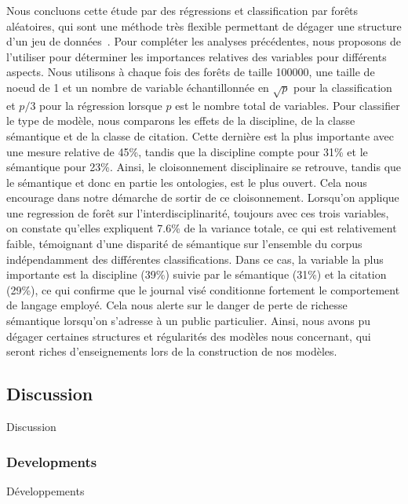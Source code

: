 {Nous concluons cette étude par des régressions et classification par forêts aléatoires, qui sont une méthode très flexible permettant de dégager une structure d'un jeu de données~\cite{liaw2002classification}. Pour compléter les analyses précédentes, nous proposons de l'utiliser pour déterminer les importances relatives des variables pour différents aspects. Nous utilisons à chaque fois des forêts de taille 100000, une taille de noeud de 1 et un nombre de variable échantillonnée en $\sqrt{p}$ pour la classification et $p/3$ pour la régression lorsque $p$ est le nombre total de variables. Pour classifier le type de modèle, nous comparons les effets de la discipline, de la classe sémantique et de la classe de citation. Cette dernière est la plus importante avec une mesure relative de 45\%, tandis que la discipline compte pour 31\% et le sémantique pour 23\%. Ainsi, le cloisonnement disciplinaire se retrouve, tandis que le sémantique et donc en partie les ontologies, est le plus ouvert. Cela nous encourage dans notre démarche de sortir de ce cloisonnement. Lorsqu'on applique une regression de forêt sur l'interdisciplinarité, toujours avec ces trois variables, on constate qu'elles expliquent 7.6\% de la variance totale, ce qui est relativement faible, témoignant d'une disparité de sémantique sur l'ensemble du corpus indépendamment des différentes classifications. Dans ce cas, la variable la plus importante est la discipline (39\%) suivie par le sémantique (31\%) et la citation (29\%), ce qui confirme que le journal visé conditionne fortement le comportement de langage employé. Cela nous alerte sur le danger de perte de richesse sémantique lorsqu'on s'adresse à un public particulier. Ainsi, nous avons pu dégager certaines structures et régularités des modèles nous concernant, qui seront riches d'enseignements lors de la construction de nos modèles.
}



\subsection{Discussion}{Discussion}


\subsubsection{Developments}{Développements}

